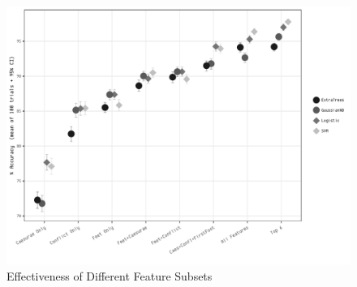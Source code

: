 \documentclass[11pt,a4paper]{scrartcl} %
\begin{document}
{\begin{figure}
    \caption{Effectiveness of Different Feature Subsets}
    \label{fig:feat_effectiv_bw}
    \includegraphics[width=\textwidth]{feat_effectiv_bw.pdf}
\end{figure}

}
\end{document}
